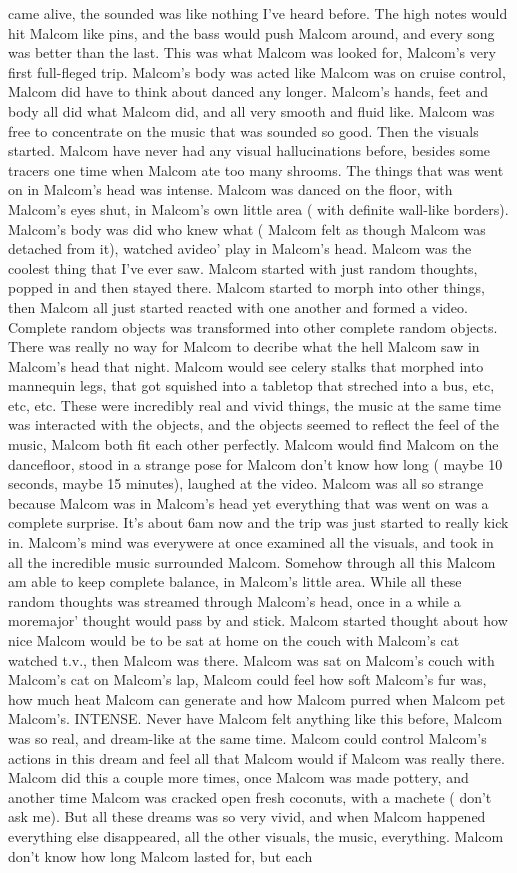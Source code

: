 \documentclass[12pt]{book}
\begin{document}
came alive, the sounded was like nothing I've heard before. The high notes would hit Malcom like pins, and the bass would push Malcom around, and every song was better than the last. This was what Malcom was looked for, Malcom's very first full-fleged trip. Malcom's body was acted like Malcom was on cruise control, Malcom did have to think about danced any longer. Malcom's hands, feet and body all did what Malcom did, and all very smooth and fluid like. Malcom was free to concentrate on the music that was sounded so good. Then the visuals started. Malcom have never had any visual hallucinations before, besides some tracers one time when Malcom ate too many shrooms. The things that was went on in Malcom's head was intense. Malcom was danced on the floor, with Malcom's eyes shut, in Malcom's own little area ( with definite wall-like borders). Malcom's body was did who knew what ( Malcom felt as though Malcom was detached from it), watched avideo' play in Malcom's head. Malcom was the coolest thing that I've ever saw. Malcom started with just random thoughts, popped in and then stayed there. Malcom started to morph into other things, then Malcom all just started reacted with one another and formed a video. Complete random objects was transformed into other complete random objects. There was really no way for Malcom to decribe what the hell Malcom saw in Malcom's head that night. Malcom would see celery stalks that morphed into mannequin legs, that got squished into a tabletop that streched into a bus, etc, etc, etc. These were incredibly real and vivid things, the music at the same time was interacted with the objects, and the objects seemed to reflect the feel of the music, Malcom both fit each other perfectly. Malcom would find Malcom on the dancefloor, stood in a strange pose for Malcom don't know how long ( maybe 10 seconds, maybe 15 minutes), laughed at the video. Malcom was all so strange because Malcom was in Malcom's head yet everything that was went on was a complete surprise. It's about 6am now and the trip was just started to really kick in. Malcom's mind was everywere at once examined all the visuals, and took in all the incredible music surrounded Malcom. Somehow through all this Malcom am able to keep complete balance, in Malcom's little area. While all these random thoughts was streamed through Malcom's head, once in a while a moremajor' thought would pass by and stick. Malcom started thought about how nice Malcom would be to be sat at home on the couch with Malcom's cat watched t.v., then Malcom was there. Malcom was sat on Malcom's couch with Malcom's cat on Malcom's lap, Malcom could feel how soft Malcom's fur was, how much heat Malcom can generate and how Malcom purred when Malcom pet Malcom's. INTENSE. Never have Malcom felt anything like this before, Malcom was so real, and dream-like at the same time. Malcom could control Malcom's actions in this dream and feel all that Malcom would if Malcom was really there. Malcom did this a couple more times, once Malcom was made pottery, and another time Malcom was cracked open fresh coconuts, with a machete ( don't ask me). But all these dreams was so very vivid, and when Malcom happened everything else disappeared, all the other visuals, the music, everything. Malcom don't know how long Malcom lasted for, but each 
\end{document}
